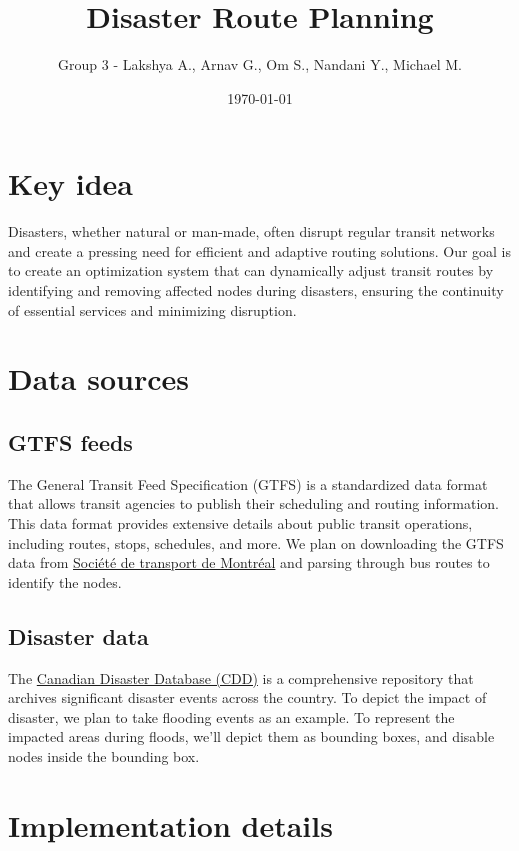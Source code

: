 \documentclass[12pt]{article}
\title{Disaster Route Planning}
\author{Group 3 - Lakshya A., Arnav G., Om S., Nandani Y., Michael M.}
\date{\today}
\begin{document}
\maketitle
\section{Key idea}\label{key-idea}

Disasters, whether natural or man-made, often disrupt regular transit
networks and create a pressing need for efficient and adaptive routing
solutions. Our goal is to create an optimization system that can
dynamically adjust transit routes by identifying and removing affected
nodes during disasters, ensuring the continuity of essential services
and minimizing disruption.

\section{Data sources}\label{data-sources}

\subsection{GTFS feeds}\label{gtfs-feeds}

The General Transit Feed Specification (GTFS) is a standardized data
format that allows transit agencies to publish their scheduling and
routing information. This data format provides extensive details about
public transit operations, including routes, stops, schedules, and more.
We plan on downloading the GTFS data from
\href{https://www.stm.info/en/about/developers}{Société de transport de
      Montréal} and parsing through bus routes to identify the nodes.

\subsection{Disaster data}\label{disaster-data}
The \href{https://www.publicsafety.gc.ca/cnt/rsrcs/cndn-dsstr-dtbs/index-en.aspx}{Canadian
      Disaster Database (CDD)} is a comprehensive repository that archives
significant disaster events across the country. To depict the impact of
disaster, we plan to take flooding events as an example. To represent
the impacted areas during floods, we'll depict them as bounding boxes,
and disable nodes inside the bounding box.

\section{Implementation details}\label{implementation-details}
\end{document}
